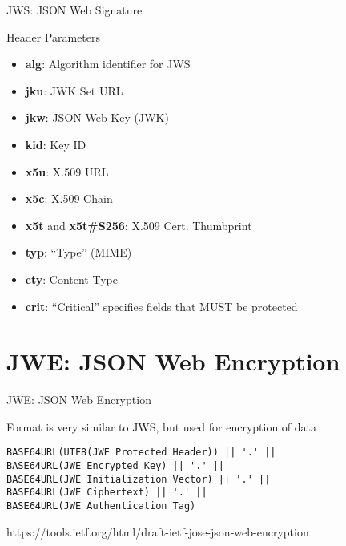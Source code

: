 \begin{frame}{JWS: JSON Web Signature}

Header Parameters

\begin{itemize}
\itemsep1pt\parskip0pt
\item
  \textbf{alg}: Algorithm identifier for JWS
\item
  \textbf{jku}: JWK Set URL
\item
  \textbf{jkw}: JSON Web Key (JWK)
\item
  \textbf{kid}: Key ID
\item
  \textbf{x5u}: X.509 URL
\item
  \textbf{x5c}: X.509 Chain
\item
  \textbf{x5t} and \textbf{x5t\#S256}: X.509 Cert. Thumbprint
\item
  \textbf{typ}: ``Type'' (MIME)
\item
  \textbf{cty}: Content Type
\item
  \textbf{crit}: ``Critical'' specifies fields that MUST be protected
\end{itemize}

\end{frame}

\section{JWE: JSON Web Encryption}\label{jwe-json-web-encryption}

\begin{frame}[fragile]{JWE: JSON Web Encryption}

Format is very similar to JWS, but used for encryption of data

\begin{verbatim}
BASE64URL(UTF8(JWE Protected Header)) || '.' ||
BASE64URL(JWE Encrypted Key) || '.' ||
BASE64URL(JWE Initialization Vector) || '.' ||
BASE64URL(JWE Ciphertext) || '.' ||
BASE64URL(JWE Authentication Tag)
\end{verbatim}

https://tools.ietf.org/html/draft-ietf-jose-json-web-encryption

\end{frame}

